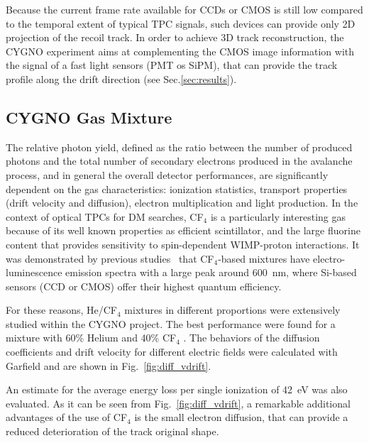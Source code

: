 \documentclass[physics,article,submit,moreauthors,pdftex]{Definitions/mdpi}
\begin{document}
Because the current frame rate available for CCDs or CMOS is still low compared to the temporal extent of typical TPC signals, such devices can provide only 2D projection of the recoil track. In order to achieve 3D track reconstruction, the CYGNO experiment aims at complementing the CMOS image information with the signal of a fast light sensors (PMT os SiPM), that can provide the track profile along the drift direction (see Sec.\ref{sec:results}).


\subsection{CYGNO Gas Mixture}\label{sec:gas}

The relative photon yield, defined as the ratio between the number of produced photons and the total number of secondary electrons produced in the avalanche process, and in general the overall detector performances, are significantly dependent on the gas characteristics: ionization statistics, transport properties (drift velocity and diffusion), electron multiplication and light production. In the context of optical TPCs for DM searches, CF$_4$ is a particularly interesting gas because of its well known properties as efficient scintillator, and the large fluorine content that provides sensitivity to spin-dependent WIMP-proton interactions. It was demonstrated by previous studies~\cite{bib:Fraga} that CF$_4$-based mixtures have electro-luminescence emission spectra with a large peak around 600~nm, where Si-based sensors (CCD or CMOS) offer their highest quantum efficiency.

For these reasons, He/CF$_{4}$ mixtures in different proportions were extensively studied within the CYGNO project. The best performance were found for a mixture with 60\% Helium and 40\% CF$_{4}$ \cite{bib:fe55New, bib:roby}. The behaviors of the diffusion coefficients and drift velocity for different electric fields were calculated with Garfield \cite{bib:garfield1,bib:garfield2} and are shown in Fig.~\ref{fig:diff_vdrift}. 

An estimate for the average energy loss per single ionization of 42~eV was also evaluated. As it can be seen from Fig.~\ref{fig:diff_vdrift}, a remarkable additional advantages of the use of CF$_4$ is the small electron diffusion, that can provide a reduced deterioration of the track original shape.
\end{document}
